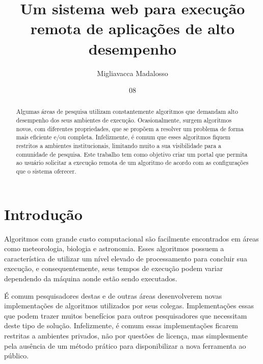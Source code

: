 \documentclass[tg]{mdtufsm}
\title{Um sistema web para execução remota de aplicações de alto desempenho}
\author{Migliavacca Madalosso}{Otávio}
\institute{Centro de Tecnologia}
\date{08}{Outubro}{2015}
\begin{document}
\maketitle
\makeapprove

\begin{abstract}
Algumas áreas de pesquisa utilizam constantemente algoritmos que demandam alto desempenho dos seus ambientes de execução. Ocasionalmente, surgem algoritmos novos, com diferentes propriedades, que se propõem a resolver um problema de forma mais eficiente e/ou completa. Infelizmente, é comum que esses algoritmos fiquem restritos a ambientes institucionais, limitando muito a sua visibilidade para a comunidade de pesquisa. Este trabalho tem como objetivo criar um portal que permita ao usuário solicitar a execução remota de um algoritmo de acordo com as configurações que o sistema oferecer.
\end{abstract}

\tableofcontents

\setlength{\baselineskip}{1.5\baselineskip}


\chapter{Introdução}

Algoritmos com grande custo computacional são facilmente encontrados em áreas como meteorologia, biologia e astronomia. Esses algoritmos possuem a característica de utilizar um nível elevado de processamento para concluir sua execução, e consequentemente, seus tempos de execução podem variar dependendo da máquina aonde estão sendo executados.

É comum pesquisadores destas e de outras áreas desenvolverem novas implementações de algoritmos utilizados por seus colegas. Implementações essas que podem trazer muitos benefícios para outros pesquisadores que necessitam deste tipo de solução. Infelizmente, é comum essas implementações ficarem restritas a ambientes privados, não por questões de licença, mas simplesmente pela ausência de um método prático para disponibilizar a nova ferramenta ao público.
\end{document}
